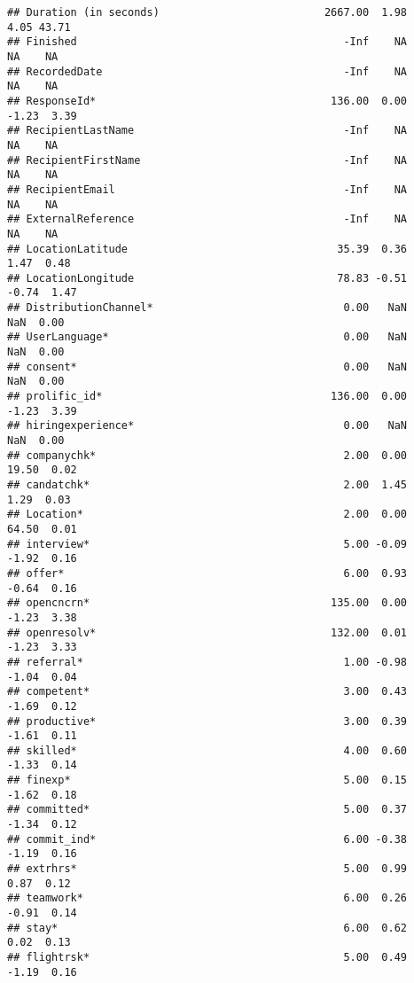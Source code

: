 \documentclass[]{article}
\begin{document}
\begin{verbatim}
## Duration (in seconds)                          2667.00  1.98     4.05 43.71
## Finished                                          -Inf    NA       NA    NA
## RecordedDate                                      -Inf    NA       NA    NA
## ResponseId*                                     136.00  0.00    -1.23  3.39
## RecipientLastName                                 -Inf    NA       NA    NA
## RecipientFirstName                                -Inf    NA       NA    NA
## RecipientEmail                                    -Inf    NA       NA    NA
## ExternalReference                                 -Inf    NA       NA    NA
## LocationLatitude                                 35.39  0.36     1.47  0.48
## LocationLongitude                                78.83 -0.51    -0.74  1.47
## DistributionChannel*                              0.00   NaN      NaN  0.00
## UserLanguage*                                     0.00   NaN      NaN  0.00
## consent*                                          0.00   NaN      NaN  0.00
## prolific_id*                                    136.00  0.00    -1.23  3.39
## hiringexperience*                                 0.00   NaN      NaN  0.00
## companychk*                                       2.00  0.00    19.50  0.02
## candatchk*                                        2.00  1.45     1.29  0.03
## Location*                                         2.00  0.00    64.50  0.01
## interview*                                        5.00 -0.09    -1.92  0.16
## offer*                                            6.00  0.93    -0.64  0.16
## opencncrn*                                      135.00  0.00    -1.23  3.38
## openresolv*                                     132.00  0.01    -1.23  3.33
## referral*                                         1.00 -0.98    -1.04  0.04
## competent*                                        3.00  0.43    -1.69  0.12
## productive*                                       3.00  0.39    -1.61  0.11
## skilled*                                          4.00  0.60    -1.33  0.14
## finexp*                                           5.00  0.15    -1.62  0.18
## committed*                                        5.00  0.37    -1.34  0.12
## commit_ind*                                       6.00 -0.38    -1.19  0.16
## extrhrs*                                          5.00  0.99     0.87  0.12
## teamwork*                                         6.00  0.26    -0.91  0.14
## stay*                                             6.00  0.62     0.02  0.13
## flightrsk*                                        5.00  0.49    -1.19  0.16

\end{verbatim}
\end{document}
